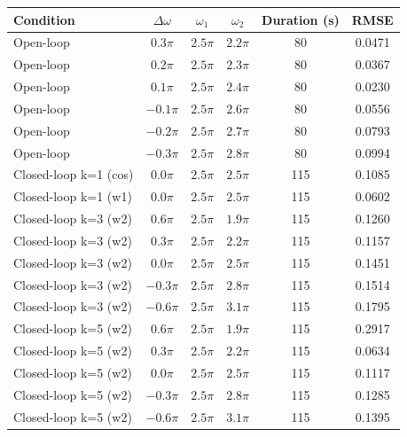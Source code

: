\begin{tabular}{lccccc}
\toprule
Condition & $\Delta\omega$ & $\omega_1$ & $\omega_2$ & Duration (s) & RMSE \\
\midrule
Open-loop & $0.3\pi$ & $2.5\pi$ & $2.2\pi$ & 80 & 0.0471 \\
Open-loop & $0.2\pi$ & $2.5\pi$ & $2.3\pi$ & 80 & 0.0367 \\
Open-loop & $0.1\pi$ & $2.5\pi$ & $2.4\pi$ & 80 & 0.0230 \\
Open-loop & $-0.1\pi$ & $2.5\pi$ & $2.6\pi$ & 80 & 0.0556 \\
Open-loop & $-0.2\pi$ & $2.5\pi$ & $2.7\pi$ & 80 & 0.0793 \\
Open-loop & $-0.3\pi$ & $2.5\pi$ & $2.8\pi$ & 80 & 0.0994 \\
Closed-loop k=1 (cos) & $0.0\pi$ & $2.5\pi$ & $2.5\pi$ & 115 & 0.1085 \\
Closed-loop k=1 (w1) & $0.0\pi$ & $2.5\pi$ & $2.5\pi$ & 115 & 0.0602 \\
Closed-loop k=3 (w2) & $0.6\pi$ & $2.5\pi$ & $1.9\pi$ & 115 & 0.1260 \\
Closed-loop k=3 (w2) & $0.3\pi$ & $2.5\pi$ & $2.2\pi$ & 115 & 0.1157 \\
Closed-loop k=3 (w2) & $0.0\pi$ & $2.5\pi$ & $2.5\pi$ & 115 & 0.1451 \\
Closed-loop k=3 (w2) & $-0.3\pi$ & $2.5\pi$ & $2.8\pi$ & 115 & 0.1514 \\
Closed-loop k=3 (w2) & $-0.6\pi$ & $2.5\pi$ & $3.1\pi$ & 115 & 0.1795 \\
Closed-loop k=5 (w2) & $0.6\pi$ & $2.5\pi$ & $1.9\pi$ & 115 & 0.2917 \\
Closed-loop k=5 (w2) & $0.3\pi$ & $2.5\pi$ & $2.2\pi$ & 115 & 0.0634 \\
Closed-loop k=5 (w2) & $0.0\pi$ & $2.5\pi$ & $2.5\pi$ & 115 & 0.1117 \\
Closed-loop k=5 (w2) & $-0.3\pi$ & $2.5\pi$ & $2.8\pi$ & 115 & 0.1285 \\
Closed-loop k=5 (w2) & $-0.6\pi$ & $2.5\pi$ & $3.1\pi$ & 115 & 0.1395 \\
\bottomrule
\end{tabular}
